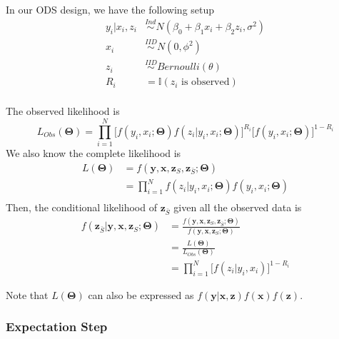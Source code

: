 \documentclass[
  12pt,
]{article}
\begin{document}
In our ODS design, we have the following setup \[
\begin{aligned}
y_i | x_i, z_i &\overset{Ind}{\sim} N(\beta_0 + \beta_1 x_i + \beta_2 z_i, \sigma^2) \\
x_i &\overset{IID}{\sim} N(0, \phi^2) \\
z_i &\overset{IID}{\sim} Bernoulli(\theta) \\
R_i &= \mathbb{I}(z_i \text{ is observed}) \\
\end{aligned}
\]

The observed likelihood is \[
L_{Obs}(\boldsymbol\Theta) = \prod_{i=1}^{N} \big[ f(y_i, x_i; \boldsymbol\Theta)f(z_i|y_i, x_i; \boldsymbol\Theta) \big]^{R_i} \big[ f(y_i, x_i; \boldsymbol\Theta) \big]^{1-R_i}
\] We also know the complete likelihood is \[
\begin{aligned}
L(\boldsymbol\Theta) 
&= f(\boldsymbol{y}, \boldsymbol{x}, \boldsymbol{z}_{S}, \boldsymbol{z}_{\bar{S}}; \boldsymbol{\Theta}) \\
&= \prod_{i=1}^{N} f(z_i|y_i, x_i; \boldsymbol\Theta)f(y_i, x_i; \boldsymbol\Theta) \\
\end{aligned}
\] Then, the conditional likelihood of \(\boldsymbol{z}_{\bar{S}}\)
given all the observed data is \[
\begin{aligned}
f(\boldsymbol{z}_{\bar{S}} | \boldsymbol{y}, \boldsymbol{x}, \boldsymbol{z}_{S}; \boldsymbol{\Theta}) 
&= \frac{f(\boldsymbol{y}, \boldsymbol{x}, \boldsymbol{z}_{S}, \boldsymbol{z}_{\bar{S}}; \boldsymbol{\Theta})}{f(\boldsymbol{y}, \boldsymbol{x}, \boldsymbol{z}_{S}; \boldsymbol{\Theta})} \\
&= \frac{L(\boldsymbol\Theta)}{L_{Obs}(\boldsymbol\Theta)} \\
&= \prod_{i=1}^{N} \big[ f(z_i | y_i, x_i) \big]^{1-R_i}
\end{aligned}
\]

Note that \(L(\boldsymbol{\Theta})\) can also be expressed as
\(f(\boldsymbol{y}|\boldsymbol{x},\boldsymbol{z})f(\boldsymbol{x})f(\boldsymbol{z})\).

\hypertarget{expectation-step}{%
\subsubsection{Expectation Step}\label{expectation-step}}
\end{document}
